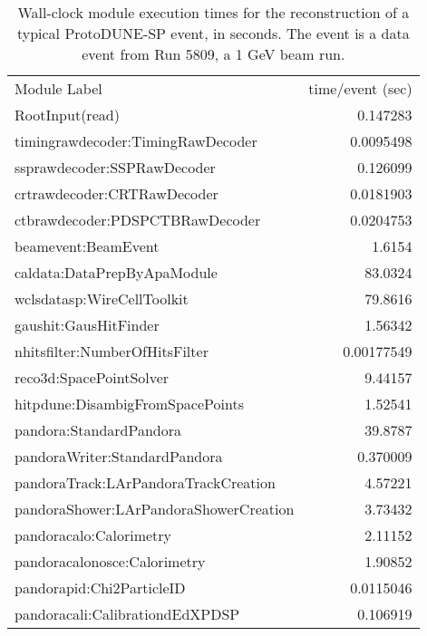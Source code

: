\documentclass[../main-v1.tex]{subfiles}
\begin{document}
\begin{longtable}
{l r}
\caption[Processing time for reconstruction modules for a  event]{Wall-clock module execution times for the reconstruction of a typical ProtoDUNE-SP event, in seconds.  The event is a data event from Run 5809, a 1 GeV beam run.} \\ \toprowrule
  \rowcolor{dunesky}
Module Label & time/event (sec)\\ \toprowrule
RootInput(read)                          &     0.147283          \\
timingrawdecoder:TimingRawDecoder        &     0.0095498         \\
ssprawdecoder:SSPRawDecoder              &     0.126099          \\
crtrawdecoder:CRTRawDecoder              &     0.0181903         \\
ctbrawdecoder:PDSPCTBRawDecoder          &     0.0204753         \\
beamevent:BeamEvent                      &      1.6154           \\
caldata:DataPrepByApaModule              &      83.0324          \\
wclsdatasp:WireCellToolkit               &      79.8616          \\
gaushit:GausHitFinder                    &      1.56342          \\
nhitsfilter:NumberOfHitsFilter           &    0.00177549         \\
reco3d:SpacePointSolver                  &      9.44157          \\
hitpdune:DisambigFromSpacePoints         &      1.52541          \\
pandora:StandardPandora                  &      39.8787          \\
pandoraWriter:StandardPandora            &     0.370009          \\
pandoraTrack:LArPandoraTrackCreation     &      4.57221          \\
pandoraShower:LArPandoraShowerCreation   &      3.73432          \\
pandoracalo:Calorimetry                  &      2.11152          \\
pandoracalonosce:Calorimetry             &      1.90852          \\
pandorapid:Chi2ParticleID                &     0.0115046         \\
pandoracali:CalibrationdEdXPDSP          &     0.106919          \\

\end{longtable}
\end{document}
